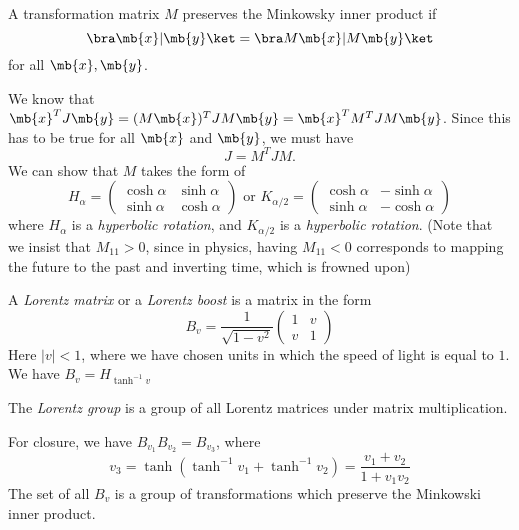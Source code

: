 \documentclass[a4paper]{article}
\begin{document}
\begin{defi}
  A transformation matrix $M$ preserves the Minkowsky inner product if
  \[
  \bra \mb{x}|\mb{y}\ket = \bra M\mb{x} | M\mb{y}\ket
  \]
  for all $\mb{x}, \mb{y}$.
\end{defi}

We know that $\mb{x}^TJ\mb{y} = (M\mb{x})^TJM\mb{y} = \mb{x}^T M^TJM\mb{y}$. Since this has to be true for all $\mb{x}$ and $\mb{y}$, we must have
\[
J = M^TJM.
\]
We can show that $M$ takes the form of
\[
H_\alpha = \begin{pmatrix}
  \cosh \alpha & \sinh \alpha\\
  \sinh \alpha & \cosh \alpha
\end{pmatrix}\text{ or } K_{\alpha/2} = 
\begin{pmatrix}
  \cosh\alpha & -\sinh\alpha\\
  \sinh\alpha & -\cosh\alpha
\end{pmatrix}
\]
where $H_\alpha$ is a \emph{hyperbolic rotation}, and $K_{\alpha/2}$ is a \emph{hyperbolic rotation}. (Note that we insist that $M_{11} > 0$, since in physics, having $M_{11} < 0$ corresponds to mapping the future to the past and inverting time, which is frowned upon)

\begin{defi}
  A \emph{Lorentz matrix} or a \emph{Lorentz boost} is a matrix in the form 
  \[
  B_v = \frac{1}{\sqrt{1 - v^2}}
  \begin{pmatrix}
    1 & v\\
    v & 1
  \end{pmatrix}
  \]
  Here $|v| < 1$, where we have chosen units in which the speed of light is equal to $1$. We have $B_v = H_{\tanh^{-1}v}$
\end{defi}

\begin{defi}
  The \emph{Lorentz group} is a group of all Lorentz matrices under matrix multiplication.
\end{defi}
\note For closure, we have $B_{v_1}B_{v_2} = B_{v_3}$, where
\[
v_3 = \tanh(\tanh^{-1} v_1 + \tanh^{-1} v_2) = \frac{v_1 + v_2}{1 + v_1v_2}
\]
The set of all $B_v$ is a group of transformations which preserve the Minkowski inner product.
\end{document}
